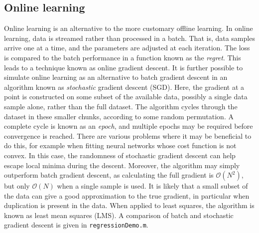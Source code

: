 \documentclass[11pt]{amsart}
\begin{document}
\subsection{Online learning}
Online learning is an alternative to the more customary offline learning. In online learning, data is streamed rather than processed in a batch. That is, data samples arrive one at a time, and the parameters are adjusted at each iteration. The loss is compared to the batch performance in a function known as the \emph{regret}. This leads to a technique known as online gradient descent. It is further possible to simulate online learning as an alternative to batch gradient descent in an algorithm known as \emph{stochastic} gradient descent (SGD). Here, the gradient at a point is constructed on some subset of the available data, possibly a single data sample alone, rather than the full dataset. The algorithm cycles through the dataset in these smaller chunks, according to some random permutation. A complete cycle is known as an \emph{epoch}, and multiple epochs may be required before convergence is reached. There are various problems where it may be beneficial to do this, for example when fitting neural networks whose cost function is not convex. In this case, the randomness of stochastic gradient descent can help escape local minima during the descent. Moreover, the algorithm may simply outperform batch gradient descent, as calculating the full gradient is $\mathcal{O}(N^2)$, but only $\mathcal{O}(N)$ when a single sample is used. It is likely that a small subset of the data can give a good approximation to the true gradient, in particular when duplication is present in the data. When applied to least squares, the algorithm is known as least mean squares (LMS). A comparison of batch and stochastic gradient descent is given in \texttt{regressionDemo.m}.
\end{document}
